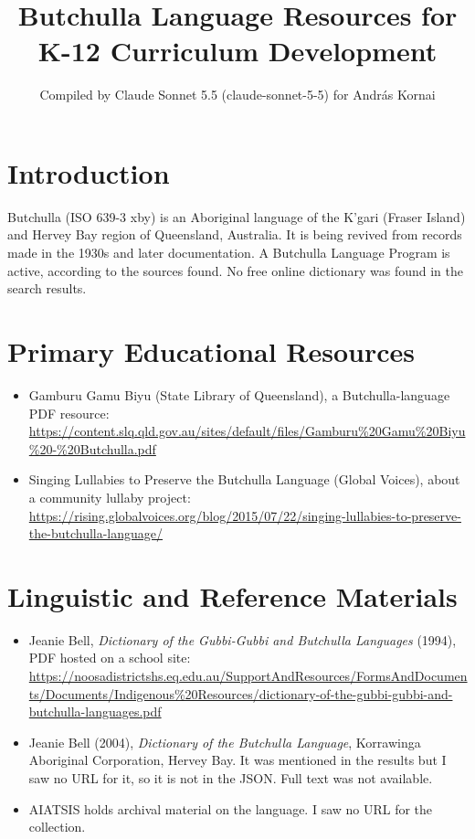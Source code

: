 \documentclass[12pt]{article}
\title{Butchulla Language Resources for K-12 Curriculum Development}
\author{Compiled by Claude Sonnet 5.5 (claude-sonnet-5-5) for Andr\'as Kornai}
\date{}
\begin{document}
\maketitle

\section{Introduction}
Butchulla (ISO 639-3 xby) is an Aboriginal language of the K'gari (Fraser Island) and Hervey Bay region of Queensland, Australia. It is being revived from records made in the 1930s and later documentation. A Butchulla Language Program is active, according to the sources found. No free online dictionary was found in the search results.

\section{Primary Educational Resources}
\begin{itemize}
\item Gamburu Gamu Biyu (State Library of Queensland), a Butchulla-language PDF resource: \url{https://content.slq.qld.gov.au/sites/default/files/Gamburu%20Gamu%20Biyu%20-%20Butchulla.pdf}
\item Singing Lullabies to Preserve the Butchulla Language (Global Voices), about a community lullaby project: \url{https://rising.globalvoices.org/blog/2015/07/22/singing-lullabies-to-preserve-the-butchulla-language/}
\end{itemize}

\section{Linguistic and Reference Materials}
\begin{itemize}
\item Jeanie Bell, \emph{Dictionary of the Gubbi-Gubbi and Butchulla Languages} (1994), PDF hosted on a school site: \url{https://noosadistrictshs.eq.edu.au/SupportAndResources/FormsAndDocuments/Documents/Indigenous%20Resources/dictionary-of-the-gubbi-gubbi-and-butchulla-languages.pdf}
\item Jeanie Bell (2004), \emph{Dictionary of the Butchulla Language}, Korrawinga Aboriginal Corporation, Hervey Bay. It was mentioned in the results but I saw no URL for it, so it is not in the JSON. Full text was not available.
\item AIATSIS holds archival material on the language. I saw no URL for the collection.
\end{itemize}
\end{document}
